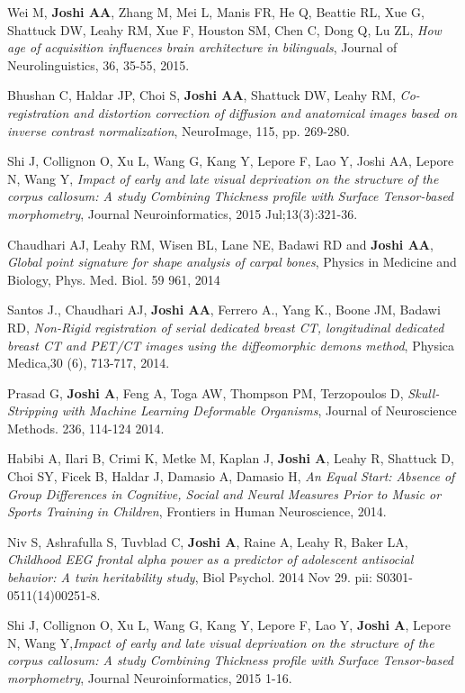 \documentclass[overlapped,line,letterpaper]{res}
\begin{document}
\begin{resume}
Wei M, \textbf{Joshi AA}, Zhang M, Mei L, Manis FR, He Q, Beattie RL, Xue G, Shattuck DW, Leahy RM, Xue F, Houston SM, Chen C, Dong Q, Lu ZL, \textit{How age of acquisition influences brain architecture in bilinguals}, Journal of Neurolinguistics, 36, 35-55, 2015. 

Bhushan C, Haldar JP, Choi S, \textbf{Joshi AA}, Shattuck DW, Leahy RM, \textit{Co-registration and distortion correction of diffusion and anatomical images based on inverse contrast normalization}, NeuroImage, 115, pp. 269-280.

Shi J, Collignon O, Xu L, Wang G, Kang Y, Lepore F, Lao Y, Joshi AA, Lepore N, Wang Y, \textit{Impact of early and late visual deprivation on the structure of the corpus callosum: A study Combining Thickness profile with Surface Tensor-based morphometry}, Journal Neuroinformatics, 2015 Jul;13(3):321-36.

Chaudhari AJ, Leahy RM, Wisen BL, Lane NE, Badawi RD and \textbf{Joshi AA}, \textit{Global point signature for shape analysis of carpal bones}, Physics in Medicine and Biology,  Phys. Med. Biol. 59 961, 2014

Santos J., Chaudhari AJ, \textbf{Joshi AA}, Ferrero A., Yang K., Boone JM, Badawi RD, \textit{Non-Rigid registration of serial dedicated breast CT, longitudinal dedicated breast CT and PET/CT images using the diffeomorphic demons method}, Physica Medica,30 (6), 713-717, 2014.

Prasad G, \textbf{Joshi A}, Feng A, Toga AW, Thompson PM, Terzopoulos D, \textit{Skull-Stripping with Machine Learning Deformable Organisms},  Journal of Neuroscience Methods.  236, 114-124 2014.

Habibi A, Ilari B, Crimi K, Metke M, Kaplan J, \textbf{Joshi A}, Leahy R, Shattuck D, Choi SY, Ficek B, Haldar J, Damasio A, Damasio H, \textit{An Equal Start: Absence of Group Differences in Cognitive, Social and Neural Measures Prior to Music or Sports Training in Children},  Frontiers in Human Neuroscience, 2014.

Niv S, Ashrafulla S, Tuvblad C, \textbf{Joshi A}, Raine A, Leahy R, Baker LA, \textit{Childhood EEG frontal alpha power as a predictor of adolescent antisocial behavior: A twin heritability study}, Biol Psychol. 2014 Nov 29. pii: S0301-0511(14)00251-8.

Shi J, Collignon O, Xu L, Wang G, Kang Y, Lepore F, Lao Y, \textbf{Joshi A}, Lepore N, Wang Y,\textit{Impact of early and late visual deprivation on the structure of the corpus callosum: A study Combining Thickness profile with Surface Tensor-based morphometry}, Journal Neuroinformatics, 2015 1-16.


\end{resume}
\end{document}
